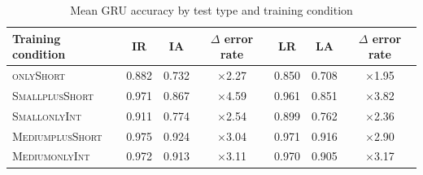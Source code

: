 \documentclass[twoside,11pt]{article}
\newcommand{\tscx}[1]{\textsc{#1}\xspace}
\newcommand{\sm}{\tscx{Small}}
\newcommand{\med}{\tscx{Medium}}
\newcommand{\origRand}{IR\xspace}
\newcommand{\longRand}{LR\xspace}
\newcommand{\origAdv}{IA\xspace}
\newcommand{\longAdv}{LA\xspace}
\newcommand{\onlyShort}{\tscx{onlyShort}}
\newcommand{\plusShort}{\tscx{plusShort}}
\newcommand{\onlyInt}{\tscx{onlyInt}}
\begin{document}

\begin{table}[t]
	\centering
	\begin{tabular}{lccc:ccc}
		\toprule
		Training condition & \origRand & \origAdv & $\Delta$ error rate & \longRand & \longAdv & $\Delta$ error rate \\
		\midrule                                                
		\onlyShort         & 0.882    & 0.732    & $\times$2.27   & 0.850    & 0.708    & $\times$1.95   \\
		\sm \plusShort     & 0.971    & 0.867    & $\times$4.59   & 0.961    & 0.851    & $\times$3.82   \\
		\sm \onlyInt       & 0.911    & 0.774    & $\times$2.54   & 0.899    & 0.762    & $\times$2.36   \\
		\med \plusShort    & 0.975    & 0.924    & $\times$3.04   & 0.971    & 0.916    & $\times$2.90   \\
		\med \onlyInt      & 0.972    & 0.913    & $\times$3.11   & 0.970    & 0.905    & $\times$3.17   \\
		\bottomrule
	\end{tabular}
	\caption{Mean GRU accuracy by test type and training condition}
	\label{tab:gru-acc-test-set-by-train}
\end{table}
\end{document}
